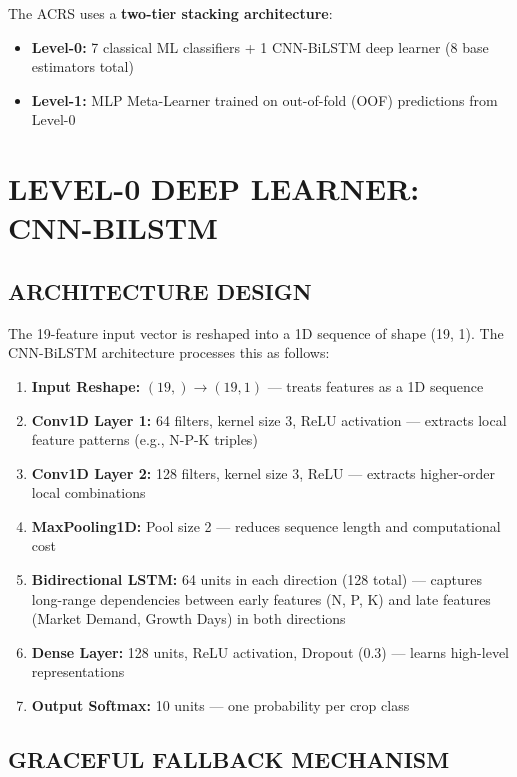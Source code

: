 \documentclass[12pt,a4paper,oneside]{report}
\begin{document}
The ACRS uses a \textbf{two-tier stacking architecture}:
\begin{itemize}[leftmargin=*, label=$\bullet$]
  \item \textbf{Level-0:} 7 classical ML classifiers + 1 CNN-BiLSTM deep learner (8 base estimators total)
  \item \textbf{Level-1:} MLP Meta-Learner trained on out-of-fold (OOF) predictions from Level-0
\end{itemize}

\section{LEVEL-0 DEEP LEARNER: CNN-BILSTM}

\subsection{ARCHITECTURE DESIGN}

The 19-feature input vector is reshaped into a 1D sequence of shape (19, 1). The CNN-BiLSTM architecture processes this as follows:

\begin{enumerate}[leftmargin=*, label=\arabic*.]
  \item \textbf{Input Reshape:} $(19,) \rightarrow (19, 1)$ --- treats features as a 1D sequence
  \item \textbf{Conv1D Layer 1:} 64 filters, kernel size 3, ReLU activation --- extracts local feature patterns (e.g., N-P-K triples)
  \item \textbf{Conv1D Layer 2:} 128 filters, kernel size 3, ReLU --- extracts higher-order local combinations
  \item \textbf{MaxPooling1D:} Pool size 2 --- reduces sequence length and computational cost
  \item \textbf{Bidirectional LSTM:} 64 units in each direction (128 total) --- captures long-range dependencies between early features (N, P, K) and late features (Market Demand, Growth Days) in both directions
  \item \textbf{Dense Layer:} 128 units, ReLU activation, Dropout (0.3) --- learns high-level representations
  \item \textbf{Output Softmax:} 10 units --- one probability per crop class
\end{enumerate}

\subsection{GRACEFUL FALLBACK MECHANISM}
\end{document}
